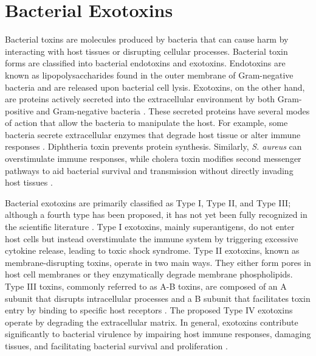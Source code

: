 \section{Bacterial Exotoxins}

Bacterial toxins are molecules produced by bacteria that can cause harm by interacting with host tissues or disrupting cellular processes.
Bacterial toxin forms are classified into bacterial endotoxins and exotoxins.
Endotoxins are known as lipopolysaccharides found in the outer membrane of Gram-negative bacteria and are released upon bacterial cell lysis.
Exotoxins, on the other hand, are proteins actively secreted into the extracellular environment by both Gram-positive and Gram-negative bacteria \cite{sheehan2022bacterial}.
These secreted proteins have several modes of action that allow the bacteria to manipulate the host.
For example, some bacteria secrete extracellular enzymes that degrade host tissue or alter immune responses \cite{henkel_toxins_2009}.
Diphtheria toxin prevents protein synthesis.
Similarly, \textit{S. aureus} can overstimulate immune responses, while cholera toxin modifies second messenger pathways to aid bacterial survival and transmission without directly invading host tissues \cite{henkel_toxins_2009}.

Bacterial exotoxins are primarily classified as Type I, Type II, and Type III; although a fourth type has been proposed, it has not yet been fully recognized in the scientific literature \cite{Ghazaei2022}.
Type I exotoxins, mainly superantigens, do not enter host cells but instead overstimulate the immune system by triggering excessive cytokine release, leading to toxic shock syndrome.
Type II exotoxins, known as membrane-disrupting toxins, operate in two main ways. They either form pores in host cell membranes or they enzymatically degrade membrane phospholipids.
Type III toxins, commonly referred to as A-B toxins, are composed of an A subunit that disrupts intracellular processes and a B subunit that facilitates toxin entry by binding to specific host receptors \cite{Ghazaei2022}  \cite{Silbergleit2020}.
The proposed Type IV exotoxins operate by degrading the extracellular matrix. In general, exotoxins contribute significantly to bacterial virulence by impairing host immune responses, damaging tissues, and facilitating bacterial survival and proliferation \cite{kruger2024toxin}.

